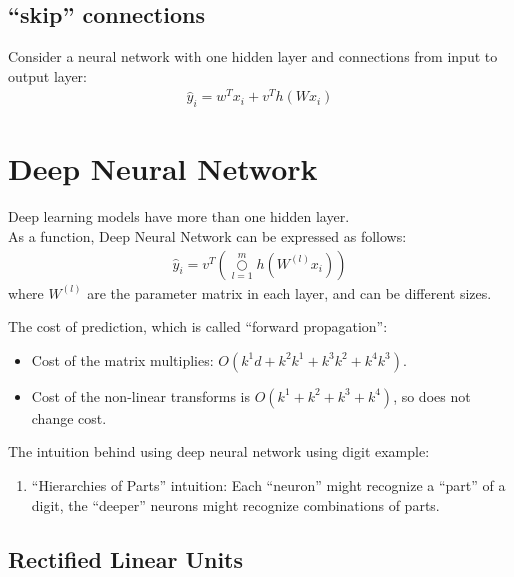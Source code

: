 \subsection{``skip'' connections} \label{sec:}
Consider a neural network with one hidden layer and connections from input to output layer:
\begin{align*}
    \hat{y}_i = w^{T}x_i + v^{T} h(W x_i)
\end{align*}

\section{Deep Neural Network} \label{sec:}
Deep learning models have more than one hidden layer.
\\ As a function, Deep Neural Network can be expressed as follows:
\begin{align*}
    \hat{y}_i = v^{T}(\mathop{\bigcirc}\limits^{m}_{l=1} h(W^{(l)}x_i)  )
\end{align*}
where $W^{(l)}$ are the parameter matrix in each layer, and can be different sizes.

\begin{remark}
The cost of prediction, which is called ``forward propagation'':
\begin{itemize}
    \item Cost of the matrix multiplies: $O(k^{1}d + k^{2}k^{1} + k^{3}k^{2} + k^{4}k^{3})$.
    \item Cost of the non-linear transforms is $O(k^{1} + k^{2} + k^{3} + k^{4})$, so does not change cost.
\end{itemize}
\end{remark}

\begin{intuition}
    The intuition behind using deep neural network using digit example:
    \begin{enumerate}
        \item ``Hierarchies of Parts'' intuition: Each ``neuron'' might recognize a ``part'' of a digit, the ``deeper'' neurons might recognize combinations of parts.
    \end{enumerate}
\end{intuition}

\subsection{Rectified Linear Units} \label{sec:}


